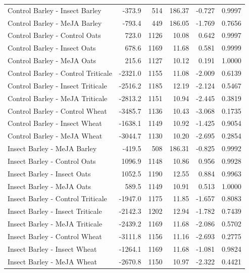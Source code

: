 \documentclass[12pt, letterpaper, ]{report}
\begin{document}
{\begin{center}
\begin{longtable}{lrrrrr}
            Control Barley - Insect Barley & -373.9 & 514 & 186.37 & -0.727 & 0.9997 \\
            Control Barley - MeJA Barley & -793.4 & 449 & 186.05 & -1.769 & 0.7656 \\
            Control Barley - Control Oats & 723.0 &1126 & 10.08 & 0.642 & 0.9997 \\
            Control Barley - Insect Oats & 678.6 &1169 & 11.68 & 0.581 & 0.9999 \\
            Control Barley - MeJA Oats & 215.6 &1127 & 10.12 & 0.191 & 1.0000 \\
            Control Barley - Control Triticale &-2321.0 &1155 & 11.08 & -2.009 & 0.6139 \\
            Control Barley - Insect Triticale &-2516.2 &1185 & 12.19 & -2.124 & 0.5467 \\
            Control Barley - MeJA Triticale &-2813.2 &1151 & 10.94 & -2.445 & 0.3819 \\
            Control Barley - Control Wheat &-3485.7 &1136 & 10.43 & -3.068 & 0.1735 \\
            Control Barley - Insect Wheat &-1638.1 &1149 & 10.92 & -1.425 & 0.9054 \\
            Control Barley - MeJA Wheat &-3044.7 &1130 & 10.20 & -2.695 & 0.2854 \\
            Insect Barley - MeJA Barley & -419.5 & 508 & 186.31 & -0.825 & 0.9992 \\
            Insect Barley - Control Oats & 1096.9 &1148 & 10.86 & 0.956 & 0.9928 \\
            Insect Barley - Insect Oats & 1052.5 &1190 & 12.55 & 0.884 & 0.9963 \\
            Insect Barley - MeJA Oats & 589.5 &1149 & 10.91 & 0.513 & 1.0000 \\
            Insect Barley - Control Triticale &-1947.0 &1175 & 11.85 & -1.657 & 0.8083 \\
            Insect Barley - Insect Triticale &-2142.3 &1202 & 12.94 & -1.782 & 0.7439 \\
            Insect Barley - MeJA Triticale &-2439.2 &1169 & 11.68 & -2.086 & 0.5702 \\
            Insect Barley - Control Wheat &-3111.8 &1156 & 11.16 & -2.693 & 0.2775 \\
            Insect Barley - Insect Wheat &-1264.1 &1169 & 11.68 & -1.081 & 0.9824 \\
            Insect Barley - MeJA Wheat &-2670.8 &1150 & 10.97 & -2.322 & 0.4421 \\

\end{longtable}
\end{center}}
\end{document}
